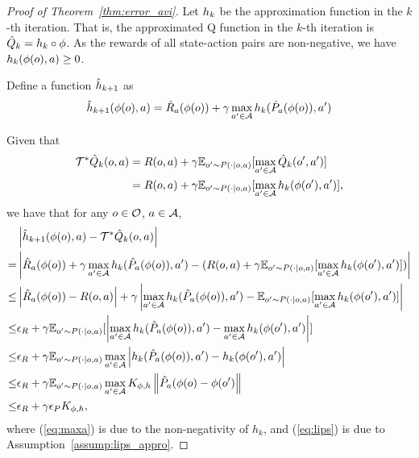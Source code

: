 \begin{proof}[Proof of Theorem~\ref{thm:error_avi}]
Let $h_k$ be the approximation function in the $k$-th iteration. That is, the approximated Q function in the $k$-th iteration is $\hat{Q}_k=h_k\circ\phi$. As the rewards of all state-action pairs are non-negative, we have $h_k(\phi(o),a)\geq 0$.

Define a function $\hat{h}_{k+1}$ as
\begin{equation}
    \hat{h}_{k+1}(\phi(o),a) = \hat{R}_a(\phi(o)) + \gamma \max_{a^\prime\in\mathcal{A}} h_k(\hat{P}_a(\phi(o)), a^\prime)
\end{equation}

Given that 
\begin{align}
    \mathcal{T}^*\hat{Q}_k(o,a) &= R(o,a) + \gamma \mathbb{E}_{o^\prime\sim P(\cdot|o,a)}[\max_{a^\prime\in\mathcal{A}} \hat{Q}_k(o^\prime,a^\prime)] \\
    &= R(o,a) + \gamma \mathbb{E}_{o^\prime\sim P(\cdot|o,a)}[\max_{a^\prime\in\mathcal{A}} h_k(\phi(o^\prime), a^\prime)],
\end{align}
we have that for any $o\in\mathcal{O}$, $a\in\mathcal{A}$,
\setlength\abovedisplayskip{3pt}
\setlength\belowdisplayskip{3pt}
\begin{align}
    &\left|\hat{h}_{k+1}(\phi(o),a) - \mathcal{T}^*\hat{Q}_k(o,a)\right| \\
    =& \left| \hat{R}_a(\phi(o)) + \gamma \max_{a^\prime\in\mathcal{A}} h_k(\hat{P}_a(\phi(o)), a^\prime) - (R(o,a) + \gamma \mathbb{E}_{o^\prime\sim P(\cdot|o,a)}[\max_{a^\prime\in\mathcal{A}} h_k(\phi(o^\prime), a^\prime)]) \right| \\
    \leq& \left| \hat{R}_a(\phi(o)) - R(o,a)\right| + \gamma \left| \max_{a^\prime\in\mathcal{A}} h_k(\hat{P}_a(\phi(o)), a^\prime) - \mathbb{E}_{o^\prime\sim P(\cdot|o,a)}[\max_{a^\prime\in\mathcal{A}} h_k(\phi(o^\prime), a^\prime)]  \right|\\
    \leq& \epsilon_R + \gamma \mathbb{E}_{o^\prime\sim P(\cdot|o,a)}[ \left| \max_{a^\prime\in\mathcal{A}} h_k(\hat{P}_a(\phi(o)), a^\prime) - \max_{a^\prime\in\mathcal{A}} h_k(\phi(o^\prime), a^\prime) \right| ]\\
    \leq& \epsilon_R + \gamma \mathbb{E}_{o^\prime\sim P(\cdot|o,a)} \max_{a^\prime\in\mathcal{A}} \left| h_k(\hat{P}_a(\phi(o)), a^\prime) - h_k(\phi(o^\prime), a^\prime) \right| \label{eq:maxa}\\
    \leq& \epsilon_R + \gamma \mathbb{E}_{o^\prime\sim P(\cdot|o,a)} \max_{a^\prime\in\mathcal{A}} K_{\phi,h} \left\| \hat{P}_a(\phi(o) - \phi(o^\prime) \right\| \label{eq:lips}\\
    \leq& \epsilon_R + \gamma \epsilon_P K_{\phi,h},
\end{align}
where (\ref{eq:maxa}) is due to the non-negativity of $h_k$, and (\ref{eq:lips}) is due to Assumption~\ref{assump:lips_appro}.


\end{proof}
